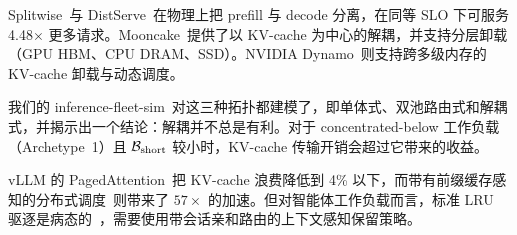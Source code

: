 Splitwise~\cite{patel2024splitwise}与 DistServe~\cite{zhong2024distserve}在物理上把 prefill 与 decode 分离，在同等 SLO 下可服务 4.48$\times$ 更多请求。Mooncake~\cite{qin2025mooncake}提供了以 KV-cache 为中心的解耦，并支持分层卸载（GPU HBM、CPU DRAM、SSD）。NVIDIA Dynamo~\cite{nvidia2026dynamo}则支持跨多级内存的 KV-cache 卸载与动态调度。

我们的 inference-fleet-sim~\cite{fleetsim2026}对这三种拓扑都建模了，即单体式、双池路由式和解耦式，并揭示出一个结论：解耦并不总是有利。对于 concentrated-below 工作负载（Archetype~1）且 $\mathcal{B}_{\text{short}}$ 较小时，KV-cache 传输开销会超过它带来的收益。

vLLM 的 PagedAttention~\cite{kwon2023vllm}把 KV-cache 浪费降低到 4\% 以下，而带有前缀缓存感知的分布式调度~\cite{llmd2026kvcache}则带来了 $57\times$ 的加速。但对智能体工作负载而言，标准 LRU 驱逐是病态的~\cite{vllm2026rfc37003}，需要使用带会话亲和路由的上下文感知保留策略。
